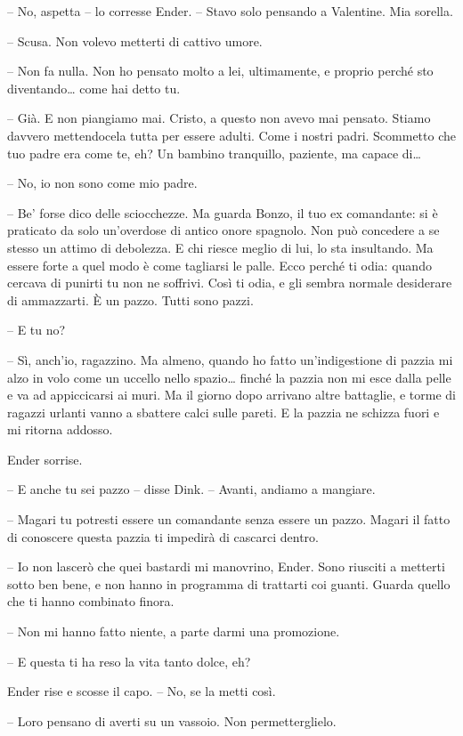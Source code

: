 {-- No, aspetta -- lo corresse Ender. -- Stavo solo pensando a
	Valentine. Mia sorella.}

{-- Scusa. Non volevo metterti di cattivo umore.}

{-- Non fa nulla. Non ho pensato molto a lei, ultimamente, e proprio
	perché sto diventando\ldots{} come hai detto tu.}

{-- Già. E non piangiamo mai. Cristo, a questo non avevo mai pensato.
	Stiamo davvero mettendocela tutta per essere adulti. Come i nostri
	padri. Scommetto che tuo padre era come te, eh? Un bambino tranquillo,
	paziente, ma capace di\ldots{}}

{-- No, io non sono come mio padre.}

{-- Be' forse dico delle sciocchezze. Ma guarda Bonzo, il tuo ex
	comandante: si è praticato da solo un'overdose di antico onore spagnolo.
	Non può concedere a se stesso un attimo di debolezza. E chi riesce
	meglio di lui, lo sta insultando. Ma essere forte a quel modo è come
	tagliarsi le palle. Ecco perché ti odia: quando cercava di punirti tu
	non ne soffrivi. Così ti odia, e gli sembra normale desiderare di
	ammazzarti. È un pazzo. Tutti sono pazzi.}

{-- E tu no?}

{-- Sì, anch'io, ragazzino. Ma almeno, quando ho fatto un'indigestione
	di pazzia mi alzo in volo come un uccello nello spazio\ldots{} finché la
	pazzia non mi esce dalla pelle e va ad appiccicarsi ai muri. Ma il
	giorno dopo arrivano altre battaglie, e torme di ragazzi urlanti vanno a
	sbattere calci sulle pareti. E la pazzia ne schizza fuori e mi ritorna
	addosso.}

{Ender sorrise.}

{-- E anche tu sei pazzo -- disse Dink. -- Avanti, andiamo a mangiare.}

{-- Magari tu potresti essere un comandante senza essere un pazzo.
	Magari il fatto di conoscere questa pazzia ti impedirà di cascarci
	dentro.}

{-- Io non lascerò che quei bastardi mi manovrino, Ender. Sono riusciti
	a metterti sotto ben bene, e non hanno in programma di trattarti coi
	guanti. Guarda quello che ti hanno combinato finora.}

{-- Non mi hanno fatto niente, a parte darmi una promozione.}

{-- E questa ti ha reso la vita tanto dolce, eh?}

{Ender rise e scosse il capo. -- No, se la metti così.}

{-- Loro pensano di averti su un vassoio. Non permetterglielo.}

